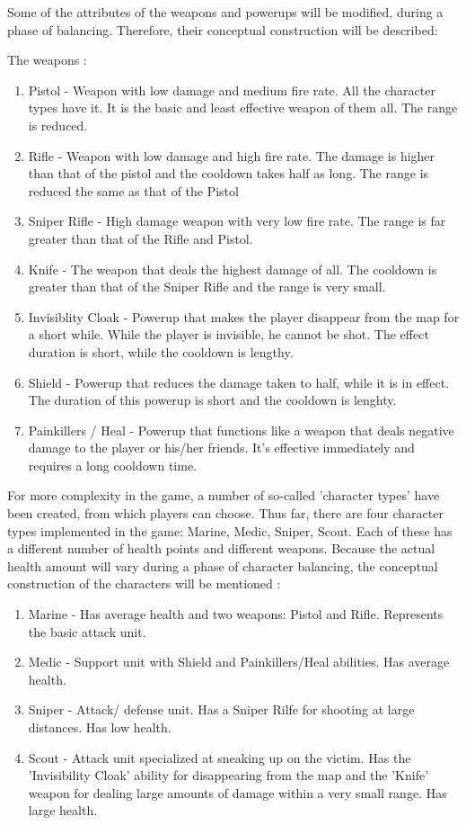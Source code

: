 Some of the attributes of the weapons and powerups will be modified, during a
phase of balancing. Therefore, their conceptual construction will be described: 

The weapons : 
\begin{enumerate}
  \item Pistol - Weapon with low damage and medium fire rate. All the character
  types have it. It is the basic and least effective weapon of them all. The
  range is reduced.
  \item Rifle - Weapon with low damage and high fire rate. The damage is higher
  than that of the pistol and the cooldown takes half as long. The range is
  reduced the same as that of the Pistol
  \item Sniper Rifle - High damage weapon with very low fire rate. The range is
  far greater than that of the Rifle and Pistol.
  \item Knife - The weapon that deals the highest damage of all. The cooldown is
  greater than that of the Sniper Rifle and the range is very small. 
  \item Invisiblity Cloak - Powerup that makes the player disappear from the
  map for a short while. While the player is invisible, he cannot be shot.
  The effect duration is short, while the cooldown is lengthy.
  \item Shield - Powerup that reduces the damage taken to half, while it is in
  effect. The duration of this powerup is short and the cooldown is lenghty.
  \item Painkillers / Heal - Powerup that functions like a weapon that deals
  negative damage to the player or his/her friends. It's effective immediately
  and requires a long cooldown time.
\end{enumerate}

For more complexity in the game, a number of so-called 'character types' have
been created, from which players can choose. Thus far, there are four character
types implemented in the game: Marine, Medic, Sniper, Scout. Each of these has a
different number of health points and different weapons. Because the actual
health amount will vary during a phase of character balancing, the conceptual
construction of the characters will be mentioned :
\begin{enumerate}
  \item Marine - Has average health and two weapons: Pistol and Rifle.
  Represents the basic attack unit.
  \item Medic - Support unit with Shield and Painkillers/Heal abilities. Has
  average health. 
  \item Sniper - Attack/ defense unit. Has a Sniper Rilfe for shooting at large
  distances. Has low health.
  \item Scout - Attack unit specialized at sneaking up on the victim. Has the
  'Invisibility Cloak' ability for disappearing from the map and the 'Knife'
  weapon for dealing large amounts of damage within a very small range. Has
  large health.
\end{enumerate}

